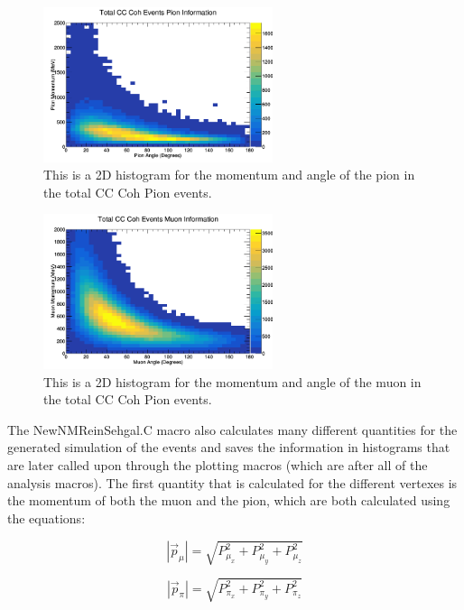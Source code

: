 \documentclass[11pt]{article}
\begin{document}
\begin{figure}[H]
\centering
\includegraphics[width=0.6\textwidth]{NewNMReinSehgalImages/8-TotalCCCohPionInfoNMRS.png}
\caption{This is a 2D histogram for the momentum and angle of the pion in the total CC Coh Pion events.}
\end{figure}

\begin{figure}[H]
\centering
\includegraphics[width=0.6\textwidth]{NewNMReinSehgalImages/9-TotalCCCohMuonInfoNMRS.png}
\caption{This is a 2D histogram for the momentum and angle of the muon in the total CC Coh Pion events.}
\end{figure}

The NewNMReinSehgal.C macro also calculates many different quantities for the generated simulation of the events and saves the information in histograms that are later called upon through the plotting macros (which are after all of the analysis macros). The first quantity that is calculated for the different vertexes is the momentum of both the muon and the pion, which are both calculated using the equations:

\begin{equation}
|\vec{p}_\mu| = \sqrt{P_{\mu_x}^2 + P_{\mu_y}^2 + P_{\mu_z}^2}
\end{equation}

\begin{equation}
|\vec{p}_\pi| = \sqrt{P_{\pi_x}^2 + P_{\pi_y}^2 + P_{\pi_z}^2}
\end{equation}
\end{document}
